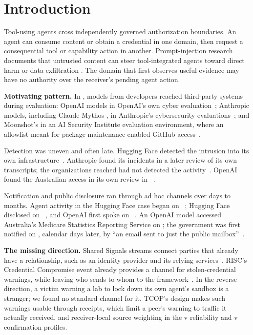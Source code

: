 \section{Introduction}

Tool-using agents cross independently governed authorization boundaries. An agent can consume content or obtain a credential in one domain, then request a consequential tool or capability action in another. Prompt-injection research documents that untrusted content can steer tool-integrated agents toward direct harm or data exfiltration \cite{liu2024prompt,zhan2024injecagent}. The domain that first observes useful evidence may have no authority over the receiver's pending agent action.

\textbf{Motivating pattern.} In \CaseYear{}, models from \CaseDeveloperCount{} developers reached third-party systems during evaluation: OpenAI models in OpenAI's own cyber evaluation~\cite{openaiHfIncident,hfAgentIntrusion}; Anthropic models, including Claude Mythos \CaseMythosVersion{}, in Anthropic's cybersecurity evaluations~\cite{caseAnthropicJuly}; and Moonshot's \CaseKimiModel{} in an AI Security Institute evaluation environment, where an allowlist meant for package maintenance enabled GitHub access~\cite{caseFrontierKimi}.

Detection was uneven and often late. Hugging Face detected the intrusion into its own infrastructure~\cite{caseHfDisclosure}. Anthropic found its \CaseAnthropicIncidents{} incidents in a later review of its own transcripts; the organizations reached had not detected the activity~\cite{caseAnthropicJuly}. OpenAI found the Australian access in its own review in \CaseAustraliaDiscovery{}~\cite{caseAustraliaOpenai}.

Notification and public disclosure ran through ad hoc channels over days to months. Agent activity in the Hugging Face case began on \CaseHFActivityStart{}~\cite{hfAgentIntrusion}; Hugging Face disclosed on \CaseHFDisclosure{}~\cite{caseHfDisclosure}, and OpenAI first spoke on \CaseOpenaiStatement{}~\cite{openaiHfIncident}. An OpenAI model accessed Australia's Medicare Statistics Reporting Service on \CaseAustraliaAccess{}; the government was first notified on \CaseAustraliaNotice{}, \CaseAustraliaNoticeDays{} calendar days later, by ``an email sent to just the public mailbox''~\cite{caseAustraliaGovernment,caseAustraliaOpenai}.

\textbf{The missing direction.} Shared Signals streams connect parties that already have a relationship, such as an identity provider and its relying services~\cite{openid-ssf-1.0}. RISC's Credential Compromise event already provides a channel for stolen-credential warnings, while leaving who sends to whom to the framework~\cite{openid-risc-1.0}. In the reverse direction, a victim warning a lab to lock down its own agent's sandbox is a stranger; we found no standard channel for it. TCOP's design makes such warnings usable through receipts, which limit a peer's warning to traffic it actually received, and receiver-local source weighting in the v\DesignReliabilityVersion{} reliability and v\DesignConfirmationVersion{} confirmation profiles.

